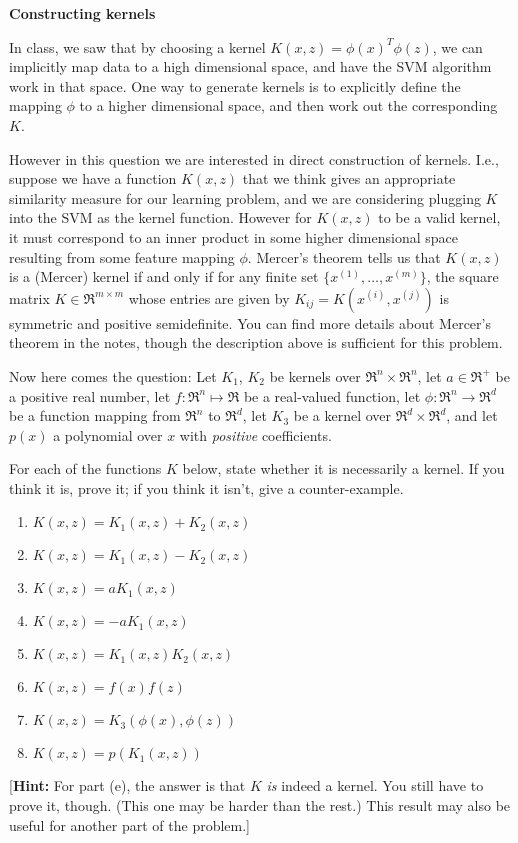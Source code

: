 \clearpage
\item {} {\bf Constructing kernels}

In class, we saw that by choosing a kernel $K(x,z) = \phi(x)^T\phi(z)$, we can
implicitly map data to a high dimensional space, and have the SVM algorithm
work in that space.  One way to generate kernels is to explicitly define the
mapping $\phi$ to a higher dimensional space, and then work out the
corresponding $K$.

However in this question we are interested in direct construction of kernels. 
I.e., suppose we have a function $K(x,z)$ that we think gives an appropriate
similarity measure for our learning problem, and we are considering plugging
$K$ into the SVM as the kernel function. However for $K(x,z)$ to be a valid
kernel, it must correspond to an inner product in some higher dimensional space
resulting from some feature mapping $\phi$.  Mercer's theorem tells us that
$K(x,z)$ is a (Mercer) kernel if and only if for any finite set $\{x^{(1)},
\ldots, x^{(m)}\}$, the square matrix $K \in \Re^{m \times m}$ whose entries
are given by $K_{ij} = K(x^{(i)},x^{(j)})$ is symmetric and positive
semidefinite. You can find more details about Mercer's theorem in the notes,
though the description above is sufficient for this problem.

Now here comes the question: Let $K_1$, $K_2$ be kernels over $\Re^n \times
\Re^n$, let $a \in \Re^+$ be a positive real number, let $f : \Re^n \mapsto
\Re$ be a real-valued function, let $\phi: \Re^n \rightarrow \Re^d$ be a
function mapping from $\Re^n$ to $\Re^d$, let $K_3$ be a kernel over $\Re^d
\times \Re^d$, and let $p(x)$ a polynomial over $x$ with \emph{positive}
coefficients.

For each of the functions $K$ below, state whether it is necessarily a
kernel.  If you think it is, prove it; if you think it isn't, give a
counter-example.

\begin{enumerate}

\item {} $K(x,z) = K_1(x,z) + K_2(x,z)$
\item {} $K(x,z) = K_1(x,z) - K_2(x,z)$
\item {} $K(x,z) = a K_1(x,z)$
\item {} $K(x,z) = -a K_1(x,z)$
\item {} $K(x,z) = K_1(x,z)K_2(x,z)$ 
\item {} $K(x,z) = f(x)f(z)$
\item {} $K(x,z) = K_3(\phi(x),\phi(z))$
\item {} $K(x,z) = p(K_1(x,z))$

\end{enumerate}

[\textbf{Hint:} For part (e), the answer is that $K$ \emph{is} indeed
a kernel. You still have to prove it, though.  (This one may be harder than the
rest.)  This result may also be useful for another part of the problem.]

\ifnum{} {
  
} \fi
